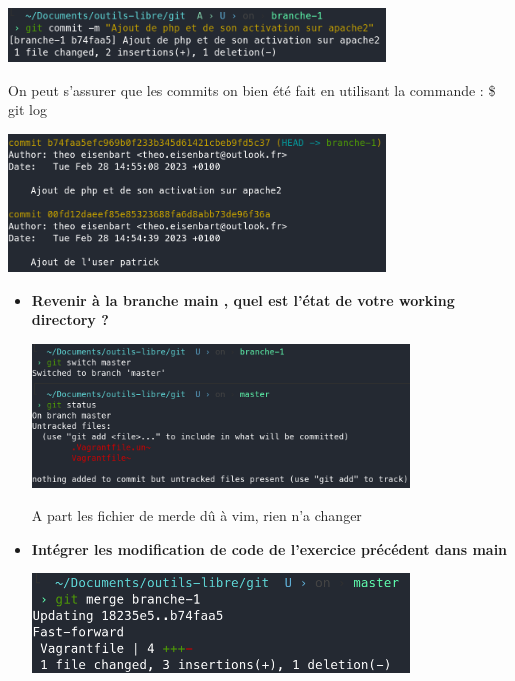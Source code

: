 \documentclass[12pt]{article}
\begin{document}
\begin{itemize}
  \includegraphics[width=10cm]{images/screen-git-td2-7.png}
  \vspace{0.3cm}

  On peut s'assurer que les commits on bien été fait en utilisant la commande : \newline
  \$ git log
  \vspace{0.3cm}

  \includegraphics[width=10cm]{images/screen-git-td2-8.png}
\end{itemize}

\begin{itemize}
  \item \textbf{Revenir à la branche main , quel est l'état de votre working directory ?}
  \vspace{0.3cm}

  \includegraphics[width=10cm]{images/screen-git-td2-9.png}
  \vspace{0.3cm}

  A part les fichier de merde dû à vim, rien n'a changer
\end{itemize}
\vspace{0.3cm}

\begin{itemize}
  \item \textbf{Intégrer les modification de code de l'exercice précédent dans main}
  \vspace{0.3cm}

  \includegraphics[width=10cm]{images/screen-git-td2-10.png}
\end{itemize}
\vspace{0.3cm}
\end{document}
